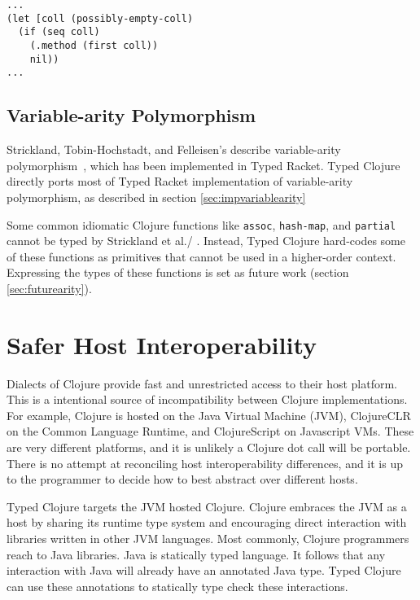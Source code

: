 \begin{lstlisting}[caption=Example of using the sequence abstraction with occurrence typing, label=lst:seqocc]
...
(let [coll (possibly-empty-coll)
  (if (seq coll)
    (.method (first coll))
    nil))
...
\end{lstlisting}

\subsection{Variable-arity Polymorphism}

Strickland, Tobin-Hochstadt, and Felleisen's describe variable-arity polymorphism~\cite{STF09},
which has been implemented in Typed Racket.
Typed Clojure directly ports most of Typed Racket implementation of variable-arity polymorphism,
as described in section \ref{sec:impvariablearity}

Some common idiomatic Clojure functions like \lstinline|assoc|, \lstinline|hash-map|,
and \lstinline|partial| cannot be typed by Strickland et al./ .
Instead, Typed Clojure hard-codes some of these functions as primitives that cannot
be used in a higher-order context.
Expressing the types of these functions is set as future work (section \ref{sec:futurearity}).

\section{Safer Host Interoperability}

Dialects of Clojure provide fast and unrestricted access to their host platform. 
This is a intentional source of incompatibility between Clojure implementations.
For example, Clojure is hosted on the Java Virtual Machine (JVM), ClojureCLR on the Common Language Runtime,
and ClojureScript on Javascript VMs. These are very different platforms, and it is unlikely
a Clojure dot call will be portable. There is no attempt at reconciling
host interoperability differences, and it is up to the programmer to decide
how to best abstract over different hosts.

Typed Clojure targets the JVM hosted Clojure.
Clojure embraces the JVM as a host by sharing its runtime type system and encouraging direct
interaction with libraries written in other JVM languages. Most commonly, Clojure programmers
reach to Java libraries. Java is statically typed language. It follows that any interaction with
Java will already have an annotated Java type. Typed Clojure can use these annotations
to statically type check these interactions.

